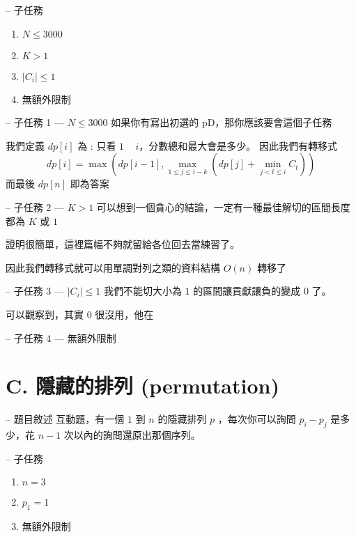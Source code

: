 \documentclass[hyperref,UTF8,notheorems,xcolor={dvipsnames}]{beamer}
\newcommand{\btitle}[1]{{\secname} -- #1}
\theoremstyle{definition}
\begin{document}
\begin{frame}[fragile]{\btitle{子任務}}
	\begin{enumerate}
		\item $N \le 3000$
		\item $K > 1$
		\item $|C_i| \le 1$
		\item 無額外限制
	\end{enumerate}
\end{frame}

\begin{frame}[fragile]{\btitle{子任務 1 --- $N \le 3000$}}
	如果你有寫出初選的 pD，那你應該要會這個子任務
	\pause

	我們定義 $dp[i]$ 為 : 只看 $1$ ~ $i$，分數總和最大會是多少。  
	因此我們有轉移式 $$dp[i] = \max(dp[i - 1], \max_{1 \le j \le i - k}{(dp[j] + \min_{j < t \le i}{C_t})})$$
	而最後 $dp[n]$ 即為答案
\end{frame}

\begin{frame}[fragile]{\btitle{子任務 2 --- $K > 1$}}
	可以想到一個貪心的結論，一定有一種最佳解切的區間長度都為 $K$ 或 $1$
	\pause

	證明很簡單，這裡篇幅不夠就留給各位回去當練習了。

	因此我們轉移式就可以用單調對列之類的資料結構 $O(n)$ 轉移了
\end{frame}

\begin{frame}[fragile]{\btitle{子任務 3 --- $|C_i| \le 1$}}
	我們不能切大小為 $1$ 的區間讓貢獻讓負的變成 $0$ 了。
	\pause

	可以觀察到，其實 $0$ 很沒用，他在
\end{frame}

\begin{frame}[fragile]{\btitle{子任務 4 --- 無額外限制}}
	
\end{frame}

\section{C. 隱藏的排列 (permutation)}

\begin{frame}[fragile]{\btitle{題目敘述}}
	互動題，有一個 $1$ 到 $n$ 的隱藏排列 $p$ ，每次你可以詢問 $p_i - p_j$ 是多少，花 $n - 1$ 次以內的詢問還原出那個序列。
\end{frame}

\begin{frame}[fragile]{\btitle{子任務}}
	\begin{enumerate}
		\item $n = 3$
		\item $p_1 = 1$
		\item 無額外限制
	\end{enumerate}
\end{frame}
\end{document}
